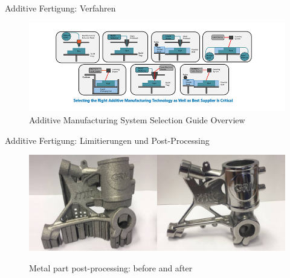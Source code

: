 \documentclass[../slides.tex]{subfiles}
\begin{document}
\begin{frame}{Additive Fertigung: Verfahren}
  \begin{minipage}[t]{\textwidth}
    \begin{figure}[]
      \includegraphics[width=\textwidth]{img_niklas/selecting-additive-manufacturing-technology-sm.png}
      \caption[short]{Additive Manufacturing System Selection Guide Overview}
    \end{figure}
  \end{minipage}
\end{frame}

\begin{frame}{Additive Fertigung: Limitierungen und Post-Processing}
  \begin{minipage}[t]{\textwidth}
    \begin{figure}[]
      \includegraphics[width=\textwidth]{img_niklas/image-32-1024x384.png}
      \label{fig:meine-grafik}
      \caption[short]{Metal part post-processing: before and after}
    \end{figure}
  \end{minipage}
\end{frame}
\end{document}
